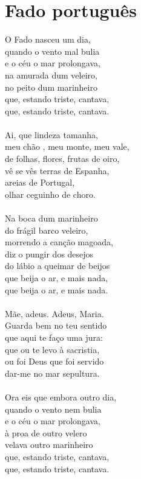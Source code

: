 \documentclass{article}
\begin{document}
\section{ Fado português}
O Fado nasceu um dia,\\
quando o vento mal bulia\\
e o céu o mar prolongava,\\
na amurada dum veleiro,\\
no peito dum marinheiro\\
que, estando triste, cantava,\\
que, estando triste, cantava.\\
\\
Ai, que lindeza tamanha,\\
meu chão , meu monte, meu vale,\\
de folhas, flores, frutas de oiro,\\
vê se vês terras de Espanha,\\
areias de Portugal,\\
olhar ceguinho de choro.\\
\\
Na boca dum marinheiro\\
do frágil barco veleiro,\\
morrendo a canção magoada,\\
diz o pungir dos desejos\\
do lábio a queimar de beijos\\
que beija o ar, e mais nada,\\
que beija o ar, e mais nada.\\
\\
Mãe, adeus. Adeus, Maria.\\
Guarda bem no teu sentido\\
que aqui te faço uma jura:\\
que ou te levo à sacristia,\\
ou foi Deus que foi servido\\
dar-me no mar sepultura.\\
\\
Ora eis que embora outro dia,\\
quando o vento nem bulia\\
e o céu o mar prolongava,\\
à proa de outro velero\\
velava outro marinheiro\\
que, estando triste, cantava,\\
que, estando triste, cantava.\\
\\
\\
\\
\end{document}
